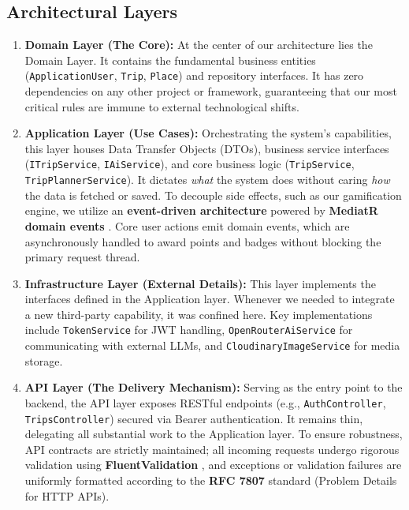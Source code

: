 \subsection{Architectural Layers}
\begin{enumerate}
    \item \textbf{Domain Layer (The Core):} At the center of our architecture lies the Domain Layer. It contains the fundamental business entities (\texttt{ApplicationUser}, \texttt{Trip}, \texttt{Place}) and repository interfaces. It has zero dependencies on any other project or framework, guaranteeing that our most critical rules are immune to external technological shifts.
    \item \textbf{Application Layer (Use Cases):} Orchestrating the system's capabilities, this layer houses Data Transfer Objects (DTOs), business service interfaces (\texttt{ITripService}, \texttt{IAiService}), and core business logic (\texttt{TripService}, \texttt{TripPlannerService}). It dictates \textit{what} the system does without caring \textit{how} the data is fetched or saved. To decouple side effects, such as our gamification engine, we utilize an \textbf{event-driven architecture} powered by \textbf{MediatR domain events} \cite{mediatr}. Core user actions emit domain events, which are asynchronously handled to award points and badges without blocking the primary request thread.
    \item \textbf{Infrastructure Layer (External Details):} This layer implements the interfaces defined in the Application layer. Whenever we needed to integrate a new third-party capability, it was confined here. Key implementations include \texttt{TokenService} for JWT handling, \texttt{OpenRouterAiService} for communicating with external LLMs, and \texttt{CloudinaryImageService} for media storage.
    \item \textbf{API Layer (The Delivery Mechanism):} Serving as the entry point to the backend, the API layer exposes RESTful endpoints (e.g., \texttt{AuthController}, \texttt{TripsController}) secured via Bearer authentication. It remains thin, delegating all substantial work to the Application layer. To ensure robustness, API contracts are strictly maintained; all incoming requests undergo rigorous validation using \textbf{FluentValidation} \cite{fluentvalidation}, and exceptions or validation failures are uniformly formatted according to the \textbf{RFC 7807} \cite{rfc7807} standard (Problem Details for HTTP APIs).
\end{enumerate}

